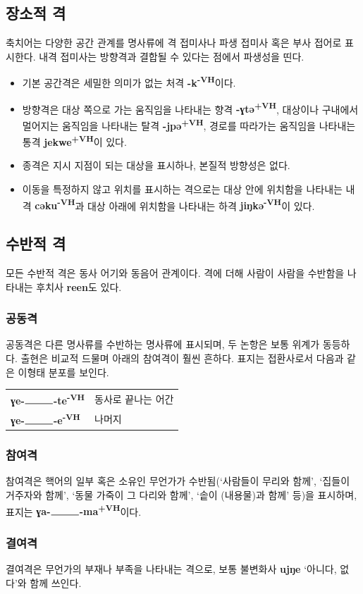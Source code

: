 \subsection{장소적 격}
축치어는 다양한 공간 관계를 명사류에 격 접미사나 파생 접미사 혹은 부사 접어로 표시한다. 내격 접미사는 방향격과 결합될 수 있다는 점에서 파생성을 띤다. 
\begin{itemize}
	\item 기본 공간격은 세밀한 의미가 없는 처격 \textbf{-k\textsuperscript{-VH}}이다.
	\item 방향격은 대상 쪽으로 가는 움직임을 나타내는 향격 \textbf{-ɣtə\textsuperscript{+VH}}, 대상이나 구내에서 멀어지는 움직임을 나타내는 탈격 \textbf{-jpə\textsuperscript{+VH}}, 경로를 따라가는 움직임을 나타내는 통격 \textbf{jekwe\textsuperscript{+VH}}이 있다.
	\item 종격은 지시 지점이 되는 대상을 표시하나, 본질적 방향성은 없다.
	\item 이동을 특정하지 않고 위치를 표시하는 격으로는 대상 안에 위치함을 나타내는 내격 \textbf{cəku\textsuperscript{-VH}}과 대상 아래에 위치함을 나타내는 하격 \textbf{jiŋkə\textsuperscript{-VH}}이 있다.
\end{itemize}
\subsection{수반적 격}
모든 수반적 격은 동사 어기와 동음어 관계이다. 격에 더해 사람이 사람을 수반함을 나타내는 후치사 \textbf{reen}도 있다.
\subsubsection{공동격}
공동격은 다른 명사류를 수반하는 명사류에 표시되며, 두 논항은 보통 위계가 동등하다. 출현은 비교적 드물며 아래의 참여격이 훨씬 흔하다. 표지는 접환사로서 다음과 같은 이형태 분포를 보인다.
\begin{center}
\begin{tabular}{ll}
\textbf{ɣe-$\rule{1cm}{0.2mm}$-te\textsuperscript{-VH}} &동사로 끝나는 어간\\
\textbf{ɣe-$\rule{1cm}{0.2mm}$-e\textsuperscript{-VH}} &나머지\\
\end{tabular}
\end{center}
\subsubsection{참여격}
참여격은 핵어의 일부 혹은 소유인 무언가가 수반됨(`사람들이 무리와 함께', `집들이 거주자와 함께', `동물 가죽이 그 다리와 함께', `솥이 (내용물)과 함께' 등)을 표시하며, 표지는 \textbf{ɣa-$\rule{1cm}{0.2mm}$-ma\textsuperscript{+VH}}이다.
\subsubsection{결여격}
결여격은 무언가의 부재나 부족을 나타내는 격으로, 보통 불변화사 \textbf{ujŋe} `아니다, 없다'와 함께 쓰인다.